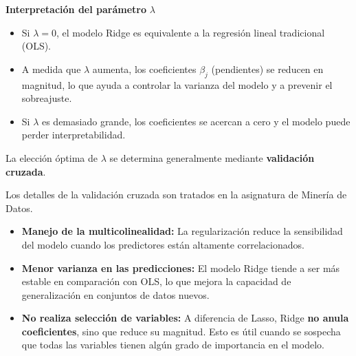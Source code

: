 \documentclass[
  letterpaper,
  DIV=11,
  numbers=noendperiod]{scrreprt}
\providecommand{\tightlist}{%
  \setlength{\itemsep}{0pt}\setlength{\parskip}{0pt}}
\begin{document}
\textbf{Interpretación del parámetro} \(\lambda\)

\begin{itemize}
\tightlist
\item
  Si \(\lambda = 0\), el modelo Ridge es equivalente a la regresión
  lineal tradicional (OLS).
\item
  A medida que \(\lambda\) aumenta, los coeficientes \(\beta_j\)
  (pendientes) se reducen en magnitud, lo que ayuda a controlar la
  varianza del modelo y a prevenir el sobreajuste.
\item
  Si \(\lambda\) es demasiado grande, los coeficientes se acercan a cero
  y el modelo puede perder interpretabilidad.
\end{itemize}

La elección óptima de \(\lambda\) se determina generalmente mediante
\textbf{validación cruzada}.

\begin{tcolorbox}[enhanced jigsaw, breakable, toprule=.15mm, bottomtitle=1mm, coltitle=black, colbacktitle=quarto-callout-caution-color!10!white, titlerule=0mm, opacitybacktitle=0.6, bottomrule=.15mm, toptitle=1mm, title=\textcolor{quarto-callout-caution-color}{\faFire}\hspace{0.5em}{Aviso}, arc=.35mm, rightrule=.15mm, opacityback=0, colframe=quarto-callout-caution-color-frame, leftrule=.75mm, left=2mm, colback=white]

Los detalles de la validación cruzada son tratados en la asignatura de
Minería de Datos.

\end{tcolorbox}

\begin{tcolorbox}[enhanced jigsaw, breakable, toprule=.15mm, bottomtitle=1mm, coltitle=black, colbacktitle=quarto-callout-note-color!10!white, titlerule=0mm, opacitybacktitle=0.6, bottomrule=.15mm, toptitle=1mm, title=\textcolor{quarto-callout-note-color}{\faInfo}\hspace{0.5em}{Propiedades Clave}, arc=.35mm, rightrule=.15mm, opacityback=0, colframe=quarto-callout-note-color-frame, leftrule=.75mm, left=2mm, colback=white]

\begin{itemize}
\item
  \textbf{Manejo de la multicolinealidad:} La regularización reduce la
  sensibilidad del modelo cuando los predictores están altamente
  correlacionados.
\item
  \textbf{Menor varianza en las predicciones:} El modelo Ridge tiende a
  ser más estable en comparación con OLS, lo que mejora la capacidad de
  generalización en conjuntos de datos nuevos.
\item
  \textbf{No realiza selección de variables:} A diferencia de Lasso,
  Ridge \textbf{no anula coeficientes}, sino que reduce su magnitud.
  Esto es útil cuando se sospecha que todas las variables tienen algún
  grado de importancia en el modelo.
\end{itemize}

\end{tcolorbox}
\end{document}
